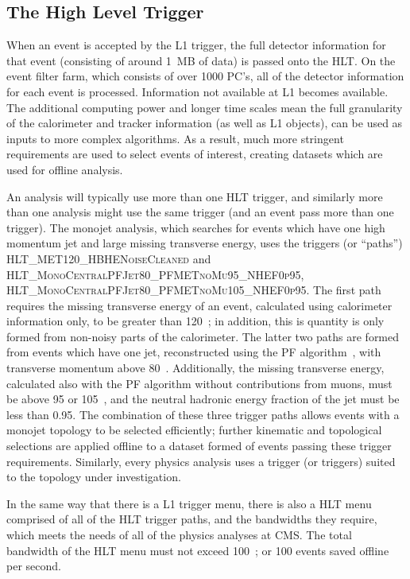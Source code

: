 \subsection{The High Level Trigger}

When an event is accepted by the L1 trigger, the full detector information for that event (consisting of around 1~MB of data) is passed onto the \ac{HLT}.
On the event filter farm, which consists of over 1000 PC's, all of the detector information for each event is processed.
Information not available at \ac{L1} becomes available. 
The additional computing power and longer time scales mean the full granularity of the calorimeter and tracker information 
(as well as \ac{L1} objects), can be used as inputs to more complex algorithms.
As a result, much more stringent requirements are used to select events of interest, creating datasets which are used for offline analysis.


An analysis will typically use more than one \ac{HLT} trigger, and similarly more than one analysis might use the same trigger (and an event pass more than one trigger).
The monojet analysis, which searches for events which have one high momentum jet and large missing transverse energy, uses the triggers (or ``paths'')  
\textsc{\small HLT\_MET120\_HBHENoiseCleaned}
and
\newline
\textsc{\small HLT\_MonoCentralPFJet80\_PFMETnoMu95\_NHEF0p95},
\newline
\textsc{\small HLT\_MonoCentralPFJet80\_PFMETnoMu105\_NHEF0p95}.
The first path requires the missing transverse energy of an event, calculated using calorimeter information only, to be greater than 120~\GeV; in addition, this is quantity is only formed from non-noisy parts of the calorimeter.
The latter two paths are formed from events which have one jet, reconstructed using the \ac{PF} algorithm~\cite{PFT-09-001}, with transverse momentum above 80~\GeV. Additionally, the missing transverse energy, calculated also with the \ac{PF} algorithm without contributions from muons, must be above 95 or 105~\GeV, and the neutral hadronic energy fraction of the jet must be less than 0.95. 
The combination of these three trigger paths allows events with a monojet topology to be selected efficiently; further kinematic and topological selections are applied offline to a dataset formed of events passing these trigger requirements.
Similarly, every physics analysis uses a trigger (or triggers) suited to the topology under investigation.


In the same way that there is a L1 trigger menu, there is also a \ac{HLT} menu 
comprised of all of the \ac{HLT} trigger paths, and the bandwidths they require, which meets the needs of all of the physics analyses at \ac{CMS}.
The total bandwidth of the \ac{HLT} menu must not exceed 100~\Hz; or 100 events saved offline per second.

